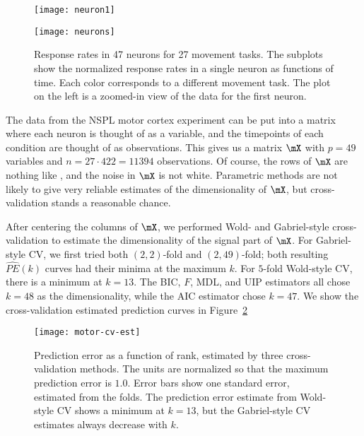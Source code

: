 \begin{figure}[tbh]
    \centering
    \begin{minipage}{0.38\textwidth}
        \begin{center}
            \texttt{[image: neuron1]}
        \end{center}
    \end{minipage}
    \begin{minipage}{0.61\textwidth}
        \begin{center}
            \texttt{[image: neurons]}
        \end{center}
    \end{minipage}
    \caption{
        Response rates in 47 neurons for 27 movement tasks.  The subplots show
        the normalized response rates in a single neuron as functions of time.  
        Each color corresponds to a different movement task.  The plot on
        the left is a zoomed-in view of the data for the first neuron.
    }\label{F:motor-cortex-data}
\end{figure}

The data from the NSPL motor cortex experiment can be put into a matrix where
each neuron is thought of as a variable, and the timepoints of each condition
are thought of as observations. This gives us a matrix $\mX$ with $p = 49$
variables and $n = 27 \cdot 422 = 11394$ observations. Of course, the rows of
$\mX$ are nothing like \iid, and the noise in $\mX$ is not white. Parametric
methods are not likely to give very reliable estimates of the dimensionality
of $\mX$, but cross-validation stands a reasonable chance.

After centering the columns of $\mX$, we performed Wold- and Gabriel-style cross-validation to estimate the dimensionality of the signal part of $\mX$.  
For Gabriel-style CV, we first tried both $(2,2)$-fold and $(2,49)$-fold; both resulting $\widehat{PE}(k)$ curves had their minima at the maximum $k$.  For $5$-fold Wold-style CV, there is a minimum at $k=13$.  The BIC, $F$, MDL, and UIP estimators all chose $k=48$ as the dimensionality, while the AIC estimator chose $k=47$.  We show the cross-validation estimated prediction curves in Figure~\ref{F:motor-cv-est}

\begin{figure}
    \centering
    \texttt{[image: motor-cv-est]}
    \caption{
        Prediction error as a function of rank, estimated by three 
        cross-validation methods.  The units are normalized so that the
        maximum prediction error is $1.0$.  Error bars show one standard    
        error, estimated from the folds. The prediction error estimate from
        Wold-style CV shows a minimum at $k=13$, but the Gabriel-style
        CV estimates always decrease with $k$.  
    }\label{F:motor-cv-est}
\end{figure}



